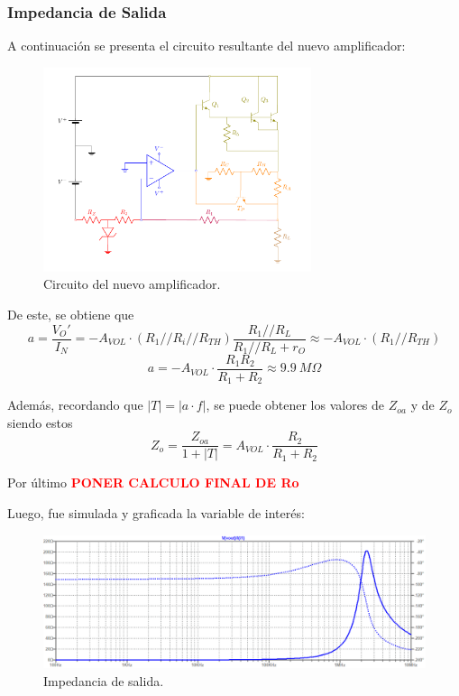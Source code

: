 \subsubsection{Impedancia de Salida}
A continuación se presenta el circuito resultante del nuevo amplificador:
\begin{figure}[H]
\centering
	\includegraphics[width=0.7\textwidth, page=9]{ImagenesEjercicio2/Regulador.pdf}
	\caption{Circuito del nuevo amplificador.}
	\label{fig:nuevoampi}
\end{figure}

De este, se obtiene que
\begin{equation*}
	a = \frac{V_O'}{I_N} = - A_{VOL} \cdot \left( R_1 // R_i // R_{TH} \right) \frac{R_1 // R_L}{R_1 // R_L + r_O} \approx - A_{VOL} \cdot \left( R_1 // R_{TH} \right)
\end{equation*}
\begin{equation}
	a = - A_{VOL} \cdot \frac{R_1 R_2}{R_1 + R_2} \approx 9.9 \ M\Omega
\end{equation}

Además, recordando que $|T| = |a \cdot f|$, se puede obtener los valores de $Z_{oa}$ y de $Z_o$ siendo estos
\begin{equation}
	Z_o = \frac{Z_{oa}}{1 + |T|} = A_{VOL} \cdot \frac{R_2}{R_1 + R_2}
\end{equation}

Por último \textcolor{red}{\textbf{PONER CALCULO FINAL DE Ro}}

Luego, fue simulada y graficada la variable de interés:
\begin{figure}[H]
\centering
	\includegraphics[width=1\textwidth]{ImagenesEjercicio2/zoutspice.png}
	\caption{Impedancia de salida.}
	\label{fig:zout}
\end{figure}

